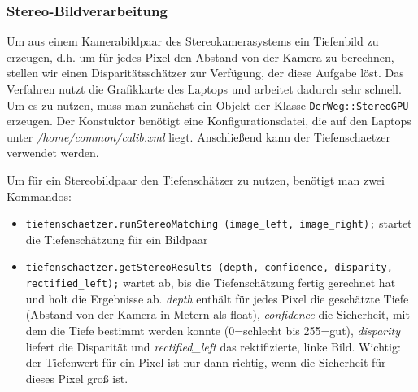 \documentclass[a4paper, 11pt]{article}
\newcommand{\code}[1]{\texttt{#1}}
\begin{document}
{%
% 

\subsubsection{Stereo-Bildverarbeitung}
\label{sec:stereo}

Um aus einem Kamerabildpaar des Stereokamerasystems ein Tiefenbild zu erzeugen, d.h. um für jedes Pixel den Abstand von der Kamera zu berechnen, stellen wir einen Disparitätsschätzer zur Verfügung, der diese Aufgabe löst. Das Verfahren nutzt die Grafikkarte des Laptops und arbeitet dadurch sehr schnell. Um es zu nutzen, muss man zunächst ein Objekt der Klasse \texttt{DerWeg::StereoGPU} erzeugen. Der Konstuktor benötigt eine Konfigurationsdatei, die auf den Laptops unter \textit{/home/common/calib.xml} liegt. Anschließend kann der Tiefenschaetzer verwendet werden.

Um für ein Stereobildpaar den Tiefenschätzer zu nutzen, benötigt man zwei Kommandos:
\begin{itemize}
\item \texttt{tiefenschaetzer.runStereoMatching (image\_left, image\_right);} startet die Tiefenschätzung für ein Bildpaar
\item \texttt{tiefenschaetzer.getStereoResults (depth, confidence, disparity, rectified\_left);} wartet ab, bis die Tiefenschätzung fertig gerechnet hat und holt die Ergebnisse ab. \textit{depth} enthält für jedes Pixel die geschätzte Tiefe (Abstand von der Kamera in Metern als float), \textit{confidence} die Sicherheit, mit dem die Tiefe bestimmt werden konnte (0=schlecht bis 255=gut), \textit{disparity} liefert die Disparität und \textit{rectified\_left} das rektifizierte, linke Bild. Wichtig: der Tiefenwert für ein Pixel ist nur dann richtig, wenn die Sicherheit für dieses Pixel groß ist.
\end{itemize}

}
\end{document}
